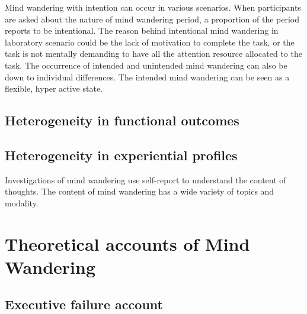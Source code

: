 Mind wandering with intention can occur in various scenarios. When participants are asked about the nature of mind wandering period, a proportion of the period reports to be intentional. The reason behind intentional mind wandering in laboratory scenario could be the lack of motivation to complete the task, or the task is not mentally demanding to have all the attention resource allocated to the task. The occurrence of intended and unintended mind wandering can also be down to individual differences.
The intended mind wandering can be seen as a flexible, hyper active state.

\subsection{Heterogeneity in functional outcomes}

\cite{McVayJOEP2009}
\cite{MrazekJoEP2012}

\cite{Smallwood2008}
\cite{McVay2012}
\cite{Unsworth2013}

\cite{Killingsworth2010}
\cite{Smallwood2007}

\cite{Baird2012}
\cite{Smeekens2016}

\cite{RubyPlos2013}
\cite{Poerio2016}

\cite{Medea2016}
\cite{DArgembeau2006}


\subsection{Heterogeneity in experiential profiles }
Investigations of mind wandering use self-report to understand the content of thoughts. The content of mind wandering has a wide variety of topics and modality.
\cite{Baird2011}
\cite{Smallwood2011}

\cite{RubyFP2013}
\cite{RubyPlos2013}
\cite{Gorgolewski2014}
\cite{Smallwood2016}



\section{Theoretical accounts of Mind Wandering}
\subsection{Executive failure account}
\cite{Kane2012}
\cite{McVayJOEP2009}

